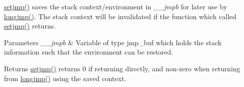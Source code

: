 \hyperlink{group__setjmp_ga2687c5ef7a3f376db90908999a9a7fc6}{setjmp()} saves the stack context/environment in {\itshape \+\_\+\+\_\+jmpb} for later use by \hyperlink{group__setjmp_ga87f44eafaab5ec0ef8f5a11a8b853acf}{longjmp()}. The stack context will be invalidated if the function which called \hyperlink{group__setjmp_ga2687c5ef7a3f376db90908999a9a7fc6}{setjmp()} returns.


\begin{DoxyParams}{Parameters}
{\em \+\_\+\+\_\+jmpb} & Variable of type {\ttfamily jmp\+\_\+buf} which holds the stack information such that the environment can be restored.\\
\hline
\end{DoxyParams}
\begin{DoxyReturn}{Returns}
\hyperlink{group__setjmp_ga2687c5ef7a3f376db90908999a9a7fc6}{setjmp()} returns 0 if returning directly, and non-\/zero when returning from \hyperlink{group__setjmp_ga87f44eafaab5ec0ef8f5a11a8b853acf}{longjmp()} using the saved context. 
\end{DoxyReturn}

